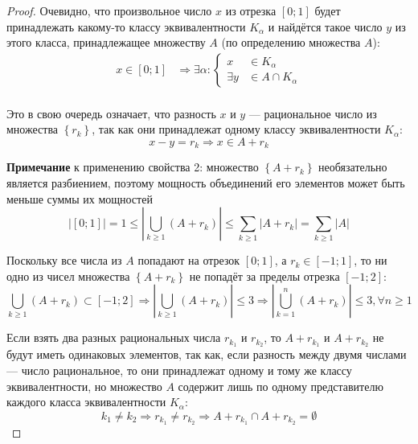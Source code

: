 \begin{proof}
    Очевидно, что произвольное число $x$ из отрезка $\left[0;1\right]$
    будет принадлежать какому-то классу эквивалентности $K_{\alpha}$ и
    найдётся такое число $y$ из этого класса,
    принадлежащее множеству $A$ (по определению множества $A$):
    \begin{equation*}
        \begin{aligned}
            x\in\left[0;1\right] &\Rightarrow \exists\alpha: \left\{
            \begin{aligned}
                 x&\in K_{\alpha}\\
                 \exists y&\in A\cap K_{\alpha}
            \end{aligned}\right.\\
        \end{aligned}
    \end{equation*}

    Это в свою очередь означает, что разность $x$ и $y$ --- рациональное число
    из множества $\left\{r_k\right\}$, так как они принадлежат
    одному классу эквивалентности $K_{\alpha}$:
           $$x-y=r_k\Rightarrow x\in A+r_k$$

    \textbf{Примечание} к применению свойства 2:
    множество $\left\{A+r_k\right\}$ необязательно является разбиением,
    поэтому мощность объединений его элементов
    может быть меньше суммы их мощностей
    \begin{equation}\label{eq:A_bigger_then_one}
        \left|\left[0;1\right]\right|=1
        \le\left|\bigcup_{k\ge 1} \left(A+r_k\right)\right|
        \le\sum_{k\ge 1} \left|A+r_k\right|
        =\sum_{k\ge 1} \left|A\right|
    \end{equation}
    
    Поскольку все числа из $A$ попадают на отрезок $\left[0;1\right]$,
    а $r_k\in\left[ -1;1\right]$,
    то ни одно из чисел множества $\left\{A+r_k\right\}$ не попадёт за пределы
    отрезка $\left[-1;2\right]$:
    $$\bigcup_{k\ge 1} \left(A+r_k\right)\subset\left[-1;2\right]
    \Rightarrow \left|\bigcup_{k\ge 1} \left(A+r_k\right)\right|\le 3
    \Rightarrow \left|\bigcup_{k=1}^n \left(A+r_k\right)\right|\le 3,
    \forall n\ge1$$
    
    Если взять два разных рациональных числа $r_{k_1}$ и $r_{k_2}$,
    то $A+r_{k_1}$ и $A+r_{k_2}$ не будут иметь одинаковых элементов,
    так как, если разность между двумя числами --- число рациональное,
    то они принадлежат одному и тому же классу эквивалентности,
    но множество $A$ содержит лишь по одному представителю
    каждого класса эквивалентности $K_{\alpha}$:
    $$k_1\neq k_2\Rightarrow
    r_{k_1}\neq r_{k_2}\Rightarrow
    A+r_{k_1} \cap A+r_{k_2} = \emptyset$$


\end{proof}
